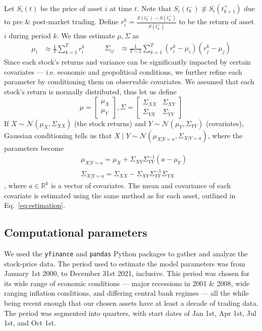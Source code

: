 \documentclass[11pt]{article}
\newcommand{\sep}{\;|\;}
\newcommand{\gauss}{\sim \mathcal{N}}
\newcommand{\R}{\mathbb{R}}
\begin{document}
Let $S_i(t)$ be the price of asset $i$ at time $t$. Note that $S_i(t_k^-) \not\equiv S_i(t_{k+1}^+)$ due to pre \& post-market trading. Define $r_i^k = \frac{S(t_k^-)-S(t_k^+)}{S(t_k^+)}$ to be the return of asset $i$ during period $k$. We thus estimate $\mu, \Sigma$ as
\begin{equation}\label{eq:estimation}
    \begin{aligned}
\mu_i &\approx \frac1T\sum_{k=1}^Tr_i^k  
\end{aligned}\qquad
\begin{aligned}
\Sigma_{ij} &\approx \frac{1}{T-1}\sum_{k=1}^T (r_i^k-\mu_i)(r_j^k-\mu_j)
\end{aligned}
\end{equation}
Since each stock's returns and variance can be significantly impacted by certain covariates --- i.e. economic and geopolitical conditions, we further refine each parameter by conditioning them on observable covariates. We assumed that each stock's return is normally distributed, thus let us define
\[
\mu = \begin{bmatrix}
    \mu_X \\
    \mu_Y
\end{bmatrix}, \Sigma = \begin{bmatrix}
    \Sigma_{XX} & \Sigma_{XY} \\
    \Sigma_{YX} & \Sigma_{YY}
\end{bmatrix}
\]
If $X \gauss(\mu_X, \Sigma_{XX})$ (the stock returns) and $Y \gauss (\mu_Y, \Sigma_{YY})$ (covariates), Gaussian conditioning tells us that $X \sep Y \gauss (\mu_{X|Y=a}, \Sigma_{X | Y =a})$, where the parameters become
\[
\begin{aligned}
    &\mu_{X | Y = a} = \mu_X +\Sigma_{XY} \Sigma_{YY}^{-1}(a-\mu_Y) \\
    &\Sigma_{X | Y = a} = \Sigma_{XX} - \Sigma_{XY}\Sigma_{YY}^{-1}\Sigma_{YX}
\end{aligned}
\]
, where $a \in \R^k$ is a vector of covariates. The mean and covariance of each covariate is estimated using the same method as for each asset, outlined in Eq.~\ref{eq:estimation}.

\subsection{Computational parameters}

We used the \texttt{yfinance} and \texttt{pandas} Python packages to gather and analyze the stock-price data. The period used to estimate the model parameters was from January 1st 2000, to December 31st 2021, inclusive. This period was chosen for its wide range of economic conditions --- major recessions in 2001 \& 2008, wide ranging inflation conditions, and differing central bank regimes --- all the while being recent enough that our chosen assets have at least a decade of trading data. The period was segmented into quarters, with start dates of Jan 1st, Apr 1st, Jul 1st, and Oct 1st.
\end{document}
